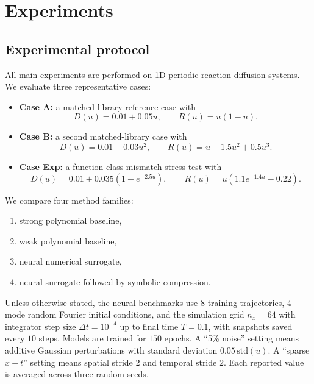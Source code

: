\section{Experiments}

\subsection{Experimental protocol}

All main experiments are performed on 1D periodic reaction-diffusion systems. We evaluate three representative cases:
\begin{itemize}[leftmargin=1.5em]
\item \textbf{Case A:} a matched-library reference case with
\begin{equation*}
D(u) = 0.01 + 0.05u, \qquad R(u) = u(1-u).
\end{equation*}
\item \textbf{Case B:} a second matched-library case with
\begin{equation*}
D(u) = 0.01 + 0.03u^2, \qquad R(u) = u - 1.5u^2 + 0.5u^3.
\end{equation*}
\item \textbf{Case Exp:} a function-class-mismatch stress test with
\begin{equation*}
D(u) = 0.01 + 0.035(1-e^{-2.5u}), \qquad R(u) = u(1.1e^{-1.4u} - 0.22).
\end{equation*}
\end{itemize}

We compare four method families:
\begin{enumerate}[leftmargin=1.5em]
\item strong polynomial baseline,
\item weak polynomial baseline,
\item neural numerical surrogate,
\item neural surrogate followed by symbolic compression.
\end{enumerate}
Unless otherwise stated, the neural benchmarks use $8$ training trajectories, $4$-mode random Fourier initial conditions, and the simulation grid $n_x=64$ with integrator step size $\Delta t=10^{-4}$ up to final time $T=0.1$, with snapshots saved every $10$ steps. Models are trained for $150$ epochs. A ``5\% noise'' setting means additive Gaussian perturbations with standard deviation $0.05\,\mathrm{std}(u)$. A ``sparse $x+t$'' setting means spatial stride $2$ and temporal stride $2$. Each reported value is averaged across three random seeds.

